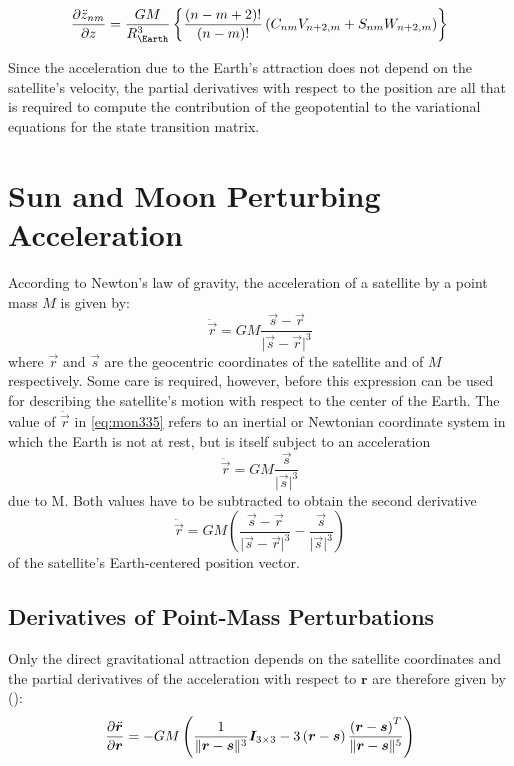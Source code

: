 \begin{equation}
  \label{eq:mont769}
  \frac{\partial \ddot{z} _{nm}}{\partial z} 
    = \frac{GM}{R_{\Earth}^3} \left\{ 
      \frac{(n-m+2)!}{(n-m)!} \left( C_{nm}V_{n+2,m} + S_{nm}W_{n+2,m} \right) \right\}
\end{equation}

Since the acceleration due to the Earth's attraction does not depend on the
satellite's velocity, the partial derivatives with respect to the position are 
all that is required to compute the contribution of the geopotential to the 
variational equations for the state transition matrix.

\section{Sun and Moon Perturbing Acceleration}
According to Newton's law of gravity, the acceleration of a satellite by a point 
mass \(M\) is given by:
\begin{equation}
    \label{eq:mon335}
    \ddot{\vec{r}} = G M \frac{\vec{s}-\vec{r}}{\lvert \vec{s} - \vec{r} \rvert ^3}
\end{equation}
where \(\vec{r}\) and \(\vec{s}\) are the geocentric coordinates of the satellite 
and of \(M\) respectively. Some care is required, however, before this expression 
can be used for describing the satellite's motion with respect to the center of 
the Earth. The value of \(\ddot{\vec{r}}\) in \ref{eq:mon335} refers to an 
inertial or Newtonian coordinate system in which the Earth is not at rest, but 
is itself subject to an acceleration
\begin{equation}
    \ddot{\vec{r}} = G M \frac{\vec{s}}{\lvert \vec{s} \rvert ^3}
\end{equation}
due to M. Both values have to be subtracted to obtain the second derivative
\begin{equation}
    \label{eq:mon337}
    \ddot{\vec{r}} = G M (\frac{\vec{s}-\vec{r}}{\lvert \vec{s} - \vec{r} \rvert ^3} - \frac{\vec{s}}{\lvert \vec{s} \rvert ^3})
\end{equation}
of the satellite's Earth-centered position vector.

\subsection{Derivatives of Point-Mass Perturbations}
\label{ssec:derivatives-of-point-mass-perturbations}
Only the direct gravitational attraction depends on the satellite coordinates 
and the partial derivatives of the acceleration with respect to $\bm{r}$ 
are therefore given by (\cite{Montenbruck2000}):
\begin{equation}
  \label{eq:mont775}
  \frac{\partial \ddot{\bm{r}}}{\partial \bm{r}} = 
    -GM \left( \frac{1}{\lVert\bm{r}-\bm{s}\rVert ^3} \bm{I}_{3\times 3} 
    -3 \left( \bm{r}-\bm{s} \right) 
      \frac{\left( \bm{r}-\bm{s} \right) ^T}{\lVert\bm{r}-\bm{s}\rVert ^5} \right)
\end{equation}

